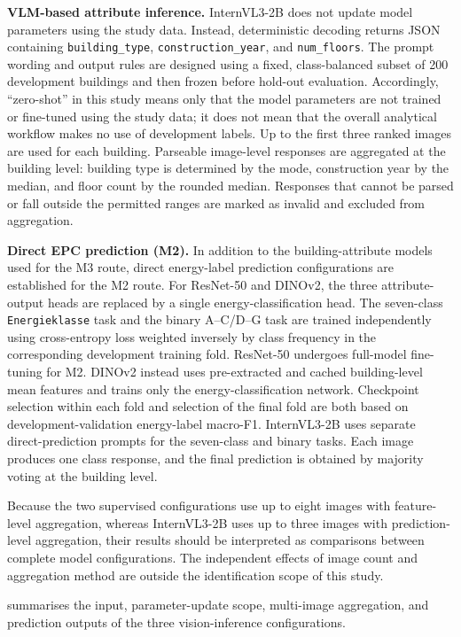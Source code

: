 \textbf{VLM-based attribute inference.} InternVL3-2B does not update model parameters using the study data. Instead, deterministic decoding returns JSON containing \texttt{building\_type}, \texttt{construction\_year}, and \texttt{num\_floors}. The prompt wording and output rules are designed using a fixed, class-balanced subset of 200 development buildings and then frozen before hold-out evaluation. Accordingly, ``zero-shot'' in this study means only that the model parameters are not trained or fine-tuned using the study data; it does not mean that the overall analytical workflow makes no use of development labels. Up to the first three ranked images are used for each building. Parseable image-level responses are aggregated at the building level: building type is determined by the mode, construction year by the median, and floor count by the rounded median. Responses that cannot be parsed or fall outside the permitted ranges are marked as invalid and excluded from aggregation.


\textbf{Direct EPC prediction (M2).} In addition to the building-attribute models used for the M3 route, direct energy-label prediction configurations are established for the M2 route. For ResNet-50 and DINOv2, the three attribute-output heads are replaced by a single energy-classification head. The seven-class \texttt{Energieklasse} task and the binary A--C/D--G task are trained independently using cross-entropy loss weighted inversely by class frequency in the corresponding development training fold. ResNet-50 undergoes full-model fine-tuning for M2. DINOv2 instead uses pre-extracted and cached building-level mean features and trains only the energy-classification network. Checkpoint selection within each fold and selection of the final fold are both based on development-validation energy-label macro-F1. InternVL3-2B uses separate direct-prediction prompts for the seven-class and binary tasks. Each image produces one class response, and the final prediction is obtained by majority voting at the building level.


Because the two supervised configurations use up to eight images with feature-level aggregation, whereas InternVL3-2B uses up to three images with prediction-level aggregation, their results should be interpreted as comparisons between complete model configurations. The independent effects of image count and aggregation method are outside the identification scope of this study.


 summarises the input, parameter-update scope, multi-image aggregation, and prediction outputs of the three vision-inference configurations.


